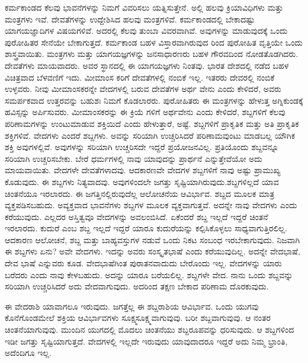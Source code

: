 ಕರ್ಮಕಾಂಡದ ಕೆಲವು ಭಾವನೆಗಳನ್ನು ನಿಮಗೆ ವಿವರಿಸಲು ಯತ್ನಿಸುತ್ತೇನೆ. ಅಲ್ಲಿ ಹಲವು ಕ್ರಿಯಾವಿಧಿಗಳು ಮತ್ತು ಮಂತ್ರಗಳು ಇವೆ. ದೇವತೆಗಳನ್ನು ಉದ್ದೇಶಿಸಿದ ಹಲವು ಮಂತ್ರಗಳಿವೆ. ಕರ್ಮಕಾಂಡದಲ್ಲಿ ಬೇಕಾದಷ್ಟು ಯಾಗಯಜ್ಞಾದಿಗಳ ವಿಷಯಗಳಿವೆ. ಅದರಲ್ಲಿ ಕೆಲವು ತುಂಬಾ ವಿವರವಾಗಿವೆ. ಅವುಗಳನ್ನು ಮಾಡುವುದಕ್ಕೆ ಒಂದು ಪುರೋಹಿತರ ಸೇನೆಯೇ ಬೇಕಾಗುತ್ತದೆ. ಕರ್ಮಕಾಂಡ ಬಹಳ ವಿಸ್ತಾರವಾಗಿರುವುದ ರಿಂದ ಪುರೋಹಿತ ವೃತ್ತಿಯೇ ಒಂದು ಶಾಸ್ತ್ರವಾಯಿತು. ಮಂತ್ರಗಳು ಮತ್ತು ಯಾಗಯಜ್ಞಗಳನ್ನು ಜನಸಾಧಾರಣರು ಬಹಳ ಗೌರವದಿಂದ ನೋಡತೊಡಗಿದರು. ದೇವತೆಗಳು ಮಾಯವಾದರು. ಅವರ ಸ್ಥಾನದಲ್ಲಿ ಈ ಯಾಗಯಜ್ಞಗಳು ನಿಂತವು. ಭಾರತ ದೇಶದಲ್ಲಿ ನಡೆದ ಬಹಳ ವಿಚಿತ್ರವಾದ ಬೆಳವಣಿಗೆ ಇದು. ಮೀಮಾಂಸ ಕರಿಗೆ ದೇವತೆಗಳಲ್ಲಿ ನಂಬಿಕೆ ಇಲ್ಲ. ಇತರರು ದೇವರಲ್ಲಿ ನಂಬಿಕೆ ಉಳ್ಳವರು. ನೀವು ಮೀಮಾಂಸಕರನ್ನೇ ವೇದಗಳಲ್ಲಿ ಬರುವ ದೇವತೆಗಳ ಅರ್ಥ ವೇನು ಎಂದು ಕೇಳಿದರೆ, ಅವರು ಸಮರ್ಪಕವಾದ ಉತ್ತರವನ್ನು ಬಹುಶಃ ನಿಮಗೆ ಕೊಡಲಾರರು. ಪುರೋಹಿತರು ಈ ಮಂತ್ರಗಳನ್ನು ಹೇಳುತ್ತ ಅಗ್ನಿಕುಂಡಕ್ಕೆ ಹವಿಸ್ಸನ್ನು ಅರ್ಪಿಸುವರು. ಮೀಮಾಂಸಕರನ್ನು ಈ ಕ್ರಿಯೆ ಗಳಿಗೆ ಅರ್ಥವೇನು ಎಂದು ಕೇಳಿದರೆ, ಶಬ್ದಗಳಿಗೆ ಕೆಲವು ಪರಿಣಾಮಗಳನ್ನು ಉಂಟುಮಾಡುವ ಶಕ್ತಿಯಿದೆ ಎಂದು ಹೇಳುತ್ತಾರೆ, ಅಷ್ಟೆ. ಶಬ್ದಗಳಿಗೆ ಪ್ರಾಕೃತಿಕ ಮತ್ತು ಅತಿ ಪ್ರಾಕೃತಿಕ ಶಕ್ತಿಗಳಿವೆ. ವೇದಗಳು ಎಂದರೆ ಶಬ್ದಗಳು. ಅವನ್ನು ಸರಿಯಾಗಿ ಉಚ್ಚರಿಸಿದರೆ ಪರಿಣಾಮವುಂಟು ಮಾಡಬಲ್ಲ ಯೌಗಿಕ ಶಕ್ತಿ ಅವುಗಳಲ್ಲಿವೆ. ಅವುಗಳನ್ನು ಸರಿಯಾಗಿ ಉಚ್ಚರಿಸದೇ ಇದ್ದರೆ ಪ್ರಯೋಜನವಿಲ್ಲ. ಪ್ರತಿಯೊಂದು ಶಬ್ದವನ್ನೂ ಸರಿಯಾಗಿ ಉಚ್ಚರಿಸಬೇಕು. ಬೇರೆ ಧರ್ಮಗಳಲ್ಲಿ ನಾವು ಯಾವುದನ್ನು ಪ್ರಾರ್ಥನೆ ಎನ್ನುತ್ತೇವೆಯೋ ಅದು ಮಾಯವಾಯಿತು. ವೇದಗಳೇ ದೇವತೆಗಳಾದವು. ಆದಕಾರಣವೇ ವೇದಗಳ ಶಬ್ದಗಳಿಗೆ ನಾವು ಅಷ್ಟು ಪ್ರಾಮುಖ್ಯ ಕೊಡುವುದು. ಈ ಶಬ್ದಗಳು ನಿತ್ಯವಾದವು. ಅವುಗಳಿಂದಲೇ ಜಗತ್ತು ಸೃಷ್ಟಿಯಾಗಿರುವುದು.ಶಬ್ದಗಳಿಲ್ಲದೆ ಯಾವ ಚಿಂತನೆಯೂ ಇರಲಾರದು. ಈ ಜಗತ್ತಿನಲ್ಲಿರುವುದೆಲ್ಲ ಆಲೋಚನೆಯ ಆವಿರ್ಭಾವ. ಶಬ್ದದ ಮೂಲಕ ಮಾತ್ರ ವ್ಯಕ್ತಪಡಿಸಬಹುದು. ಅವ್ಯಕ್ತವಾದ ಭಾವನೆಗಳು ಶಬ್ದಗಳ ಮೂಲಕ ವ್ಯಕ್ತವಾಗುತ್ತವೆ. ಅದನ್ನೇ ನಾವು ವೇದಗಳು ಎಂದು ಕರೆಯುವುದು. ಎಲ್ಲದರ ಅಸ್ತಿತ್ವವೂ ವೇದಗಳನ್ನು ಅವಲಂಬಿಸಿದೆ. ಏಕೆಂದರೆ ಶಬ್ದ ಇಲ್ಲದೆ ಇದ್ದರೆ ಚಿಂತನೆ ಇರಲಾರದು. ಕುದುರೆ ಎಂಬ ಶಬ್ದ ಇಲ್ಲದೆ ಇದ್ದರೆ ಯಾರೂ ಕುದುರೆಯನ್ನು ಕಲ್ಪಿಸಿಕೊಳ್ಳಲು ಸಾಧ್ಯವಾಗುತ್ತಿರಲಿಲ್ಲ. ಆದಕಾರಣ ಆಲೋಚನೆ, ಶಬ್ದ ಮತ್ತು ಬಾಹ್ಯವಸ್ತುಗಳ ನಡುವೆ ಒಂದು ನಿಕಟ ಸಂಬಂಧ ಇರಬೇಕಾಗುವುದು. ನಿಜವಾಗಿ ಈ ಶಬ್ದಗಳು ಏನು? ಅವೇ ವೇದಗಳು. ಇದನ್ನು ಅವರು ಸಂಸ್ಕೃತಭಾಷೆ ಎಂದು ಕರೆಯುವುದಿಲ್ಲ. ಅದನ್ನೇ ವೇದಭಾಷೆ, ದೇವ ಭಾಷೆ ಎನ್ನುವರು ಕೂಡ. ವೇದಭಾಷೆಗಿಂತ ಪುರಾತನವಾದುದು ಬೇರೊಂದು ಇಲ್ಲ. ವೇದಗಳನ್ನು ಯಾರು ಬರೆದರು ಎಂದು ನಾವು ಕೇಳಬಹುದು. ಅದನ್ನು ಯಾರೂ ಬರೆಯಲಿಲ್ಲ. ಶಬ್ದಗಳೇ ವೇದ. ನಾನು ಒಂದು ಶಬ್ದವನ್ನು ಸರಿಯಾಗಿ ಉಚ್ಚರಿಸಿದರೆ ಅದು ವೇದವಾಗುವುದು. ಅದರಿಂದ ತಕ್ಷಣ ಬೇಕಾದ ಪರಿಣಾಮ ದೊರಕುವುದು.

ಈ ವೇದರಾಶಿ ಯಾವಾಗಲೂ ಇರುವುದು. ಜಗತ್ತೆಲ್ಲ ಈ ಶಬ್ದರಾಶಿಯ ಆವಿರ್ಭಾವ. ಒಂದು ಯುಗವು ಕೊನೆಗೊಂಡಮೇಲೆ ಶಕ್ತಿಯ ಆವಿರ್ಭಾವಗಳು ಸೂಕ್ಷ್ಮಸೂಕ್ಷ್ಮವಾಗುವುವು. ಬರೀ ಶಬ್ದವಾಗುವುವು. ಆ ನಂತರ ಚಿಂತನೆಯಾಗುವುವು. ಮುಂದಿನ ಯುಗದಲ್ಲಿ ಮೊದಲು ಚಿಂತನೆಯು ಶಬ್ದರೂಪವನ್ನು ಧರಿಸುವುದು. ಆ ಶಬ್ದಗಳಿಂದ ಇಡೀ ಜಗತ್ತು ಸೃಷ್ಟಿಯಾಗುತ್ತದೆ. ವೇದಗಳಲ್ಲಿ ಇಲ್ಲದೇ ಇರುವುದು ಯಾವುದಾದರೂ ಇದ್ದರೆ ಅದು ನಿಮ್ಮ ಭ್ರಾಂತಿ, ಅದೆಂದಿಗೂ ಇಲ್ಲ.

